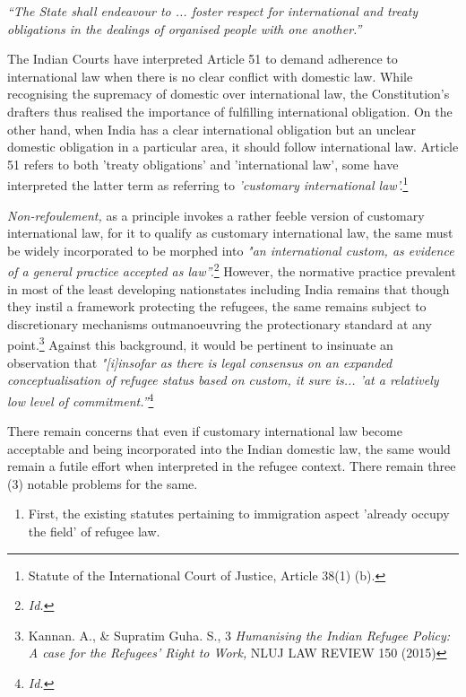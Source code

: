 \begin{multicols}{2}
\noi
\textit{“The State shall endeavour to ... foster respect for international and treaty obligations in
the dealings of organised people with one another.”}

\noi
The Indian Courts have interpreted Article 51 to demand adherence to international law when
there is no clear conflict with domestic law. While recognising the supremacy of domestic
over international law, the Constitution's drafters thus realised the importance of fulfilling
international obligation. On the other hand, when India has a clear international obligation
but an unclear domestic obligation in a particular area, it should follow international law.
Article 51 refers to both 'treaty obligations' and 'international law', some have interpreted the
latter term as referring to \textit{'customary international law'.}\footnote{Statute of the International Court of Justice, Article 38(1) (b).}


\noi
\textit{Non-refoulement,} as a principle invokes a rather feeble version of customary international
law, for it to qualify as customary international law, the same must be widely incorporated to
be morphed into \textit{"an international custom, as evidence of a general practice accepted as
law”.}\footnote{\textit{Id.}} However, the normative practice prevalent in most of the least developing nationstates including India remains that though they instil a framework protecting the refugees, the
same remains subject to discretionary mechanisms outmanoeuvring the protectionary
standard at any point.\footnote{Kannan. A., \& Supratim Guha. S., 3 \textit{Humanising the Indian Refugee Policy: A case for the Refugees’ Right to Work,} NLUJ LAW REVIEW 150 (2015)} Against this background, it would be pertinent to insinuate an observation that \textit{"[i]insofar as there is legal consensus on an expanded conceptualisation of
refugee status based on custom, it sure is... 'at a relatively low level of commitment.”}\footnote{\textit{Id.}}


\noi
There remain concerns that even if customary international law become acceptable and being
incorporated into the Indian domestic law, the same would remain a futile effort when
interpreted in the refugee context. There remain three (3) notable problems for the same.

\begin{enumerate}[label=$\bullet$]
\item First, the existing statutes pertaining to immigration aspect 'already occupy the field'
of refugee law.


\end{enumerate}
\end{multicols}
